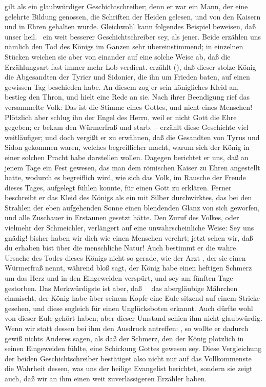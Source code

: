 \begin{aufza}
\begin{aufzb}
\item {} gilt als ein glaubwürdiger Geschichtschreiber; denn er war ein Mann, der eine gelehrte Bildung genossen, die Schriften der Heiden gelesen, und von den Kaisern  und  in Ehren gehalten wurde. Gleichwohl kann folgendes Beispiel beweisen, daß unser heil.\  ein weit besserer Geschichtschreiber sey, als jener. Beide erzählen uns nämlich den Tod des Königs  im Ganzen sehr übereinstimmend; in einzelnen Stücken weichen sie aber von einander auf eine solche Weise ab, daß die Erzählungsart  fast immer mehr Lob verdient.  erzählt (), daß dieser stolze König die Abgesandten der Tyrier und Sidonier, die ihn um Frieden baten, auf einen gewissen Tag beschieden habe. An diesem zog er sein königliches Kleid an, bestieg den Thron, und hielt eine Rede an sie. Nach ihrer Beendigung rief das versammelte Volk: Das ist die Stimme eines Gottes, und nicht eines Menschen! Plötzlich aber schlug ihn der Engel des Herrn, weil er nicht Gott die Ehre gegeben; er bekam den Würmerfraß und starb. --  erzählt diese Geschichte viel weitläufiger; und doch vergißt er zu erwähnen, daß die Gesandten von Tyrus und Sidon gekommen waren, welches begreiflicher macht, warum sich der König in einer solchen Pracht habe darstellen wollen. Dagegen berichtet er uns, daß an jenem Tage ein Fest gewesen, das man dem römischen Kaiser zu Ehren angestellt hatte, wodurch es begreiflich wird, wie sich das Volk, im Rausche der Freude dieses Tages, aufgelegt fühlen konnte,  für einen Gott zu erklären. Ferner beschreibt er das Kleid des Königs als ein mit Silber durchwirktes, das bei den Strahlen der eben aufgehenden Sonne einen blendenden Glanz von sich geworfen, und alle Zuschauer in Erstaunen gesetzt hätte. Den Zuruf des Volkes, oder vielmehr der Schmeichler, verlängert  auf eine unwahrscheinliche Weise: Sey uns gnädig! bisher haben wir dich wie einen Menschen verehrt; jetzt sehen wir, daß du erhaben bist über die menschliche Natur! Auch bestimmt er die wahre Ursache des Todes dieses Königs nicht so gerade, wie der Arzt , der sie einen Würmerfraß nennt, während  bloß sagt, der König habe einen heftigen Schmerz um das Herz und in den Eingeweiden verspürt, und sey am fünften Tage gestorben. Das Merkwürdigste ist aber, daß~\  das abergläubige Mährchen einmischt, der König habe über seinem Kopfe eine Eule sitzend auf einem Stricke gesehen, und diese sogleich für einen Unglücksboten erkannt. Auch  dürfte wohl von dieser Eule gehört haben; aber dieser Umstand schien ihm nicht glaubwürdig. Wenn wir statt dessen bei ihm den Ausdruck antreffen: , so wollte er dadurch gewiß nichts Anderes sagen, als daß der Schmerz, den der König plötzlich in seinen Eingeweiden fühlte, eine Schickung Gottes gewesen sey. Diese Vergleichung der beiden Geschichtschreiber bestätiget also nicht nur auf das Vollkommenste die Wahrheit dessen, was uns der heilige Evangelist berichtet, sondern sie zeigt auch, daß wir an ihm einen weit zuverlässigeren Erzähler haben.~

\end{aufzb}
\end{aufza}
